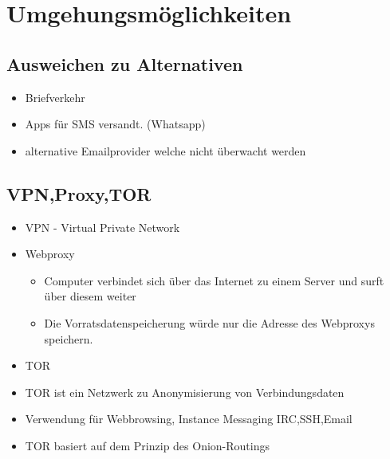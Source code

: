 \section{Umgehungsmöglichkeiten}
  \subsection{Ausweichen zu Alternativen}
    \begin{frame}
      \begin{itemize}
        \item Briefverkehr
        \item Apps für SMS versandt. (Whatsapp)
        \item alternative Emailprovider welche nicht überwacht werden
        

      \end{itemize}
    \end{frame}
      \subsection{VPN,Proxy,TOR}
    \begin{frame}
      \begin{itemize}
        \item VPN - Virtual Private Network 
        \item Webproxy
               \begin{itemize}
         \item Computer verbindet sich über das Internet zu einem Server und surft über diesem weiter
         \item Die Vorratsdatenspeicherung würde nur die Adresse des Webproxys speichern.
  
      \end{itemize}
      \end{itemize}
    \end{frame}
        \begin{frame}
      \begin{itemize}
        \item TOR
        \item TOR ist ein Netzwerk zu Anonymisierung von Verbindungsdaten
        \item Verwendung für Webbrowsing, Instance Messaging IRC,SSH,Email
        \item TOR basiert auf dem Prinzip des Onion-Routings
   
      \end{itemize}
    \end{frame}






